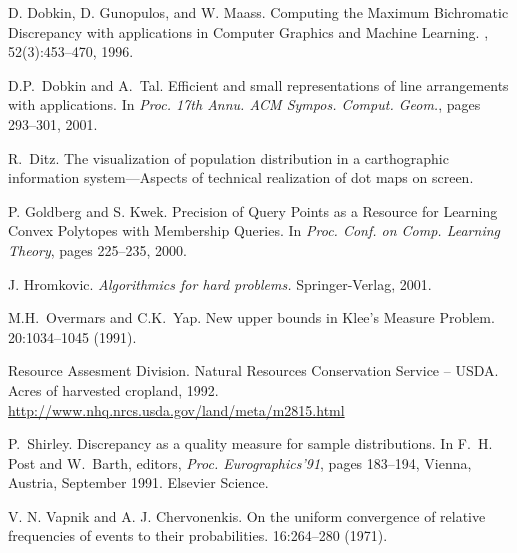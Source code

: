 \documentclass{elsart}
\newcommand{\patscomment}[1]{}
\begin{document}
\begin{thebibliography}{99}
D. Dobkin, D. Gunopulos, and W. Maass.
\newblock Computing the Maximum Bichromatic Discrepancy with applications in Computer Graphics and Machine Learning.
, 52(3):453--470, 1996.


  D.P.~Dobkin and A.~Tal.
  \newblock Efficient and small representations of line arrangements
  with applications.
  \newblock In {\em Proc. 17th Annu. ACM Sympos. Comput. Geom.},
  pages 293--301, 2001.

  R.~Ditz. The visualization of population distribution in a carthographic
  information system---Aspects of technical realization of dot maps on screen.

P. Goldberg and S. Kwek.
\newblock Precision of Query Points as a Resource for Learning Convex Polytopes
with Membership Queries.
\newblock In {\em Proc. Conf. on Comp. Learning Theory}, pages 225--235, 2000.

J. Hromkovic. 
\newblock \emph{Algorithmics for hard problems.}
\newblock Springer-Verlag, 2001.


  M.H.~Overmars and C.K.~Yap.
  \newblock New upper bounds in Klee's Measure Problem.
   20:1034--1045 (1991).

  Resource Assesment Division.
  Natural Resources Conservation Service -- USDA.
  Acres of harvested cropland, 1992.
  \url{http://www.nhq.nrcs.usda.gov/land/meta/m2815.html}

P.~Shirley.
\newblock Discrepancy as a quality measure for sample distributions.
\newblock In F.~H. Post and W.~Barth, editors, {\em Proc. Eurographics'91},
  pages 183--194, Vienna, Austria, September 1991. Elsevier Science.


 V. N. Vapnik and A. J. Chervonenkis.
  \newblock On the uniform convergence of relative frequencies of events
  to their probabilities.
  16:264--280 (1971).


\end{thebibliography}

\patscomment{
Table~\ref{table2} shows our results.  All errors
were computed using squares of 60 fixed sizes.  Each column was
computed for only one set $P$. \comment{Perhaps we should repeat the
  generate at least a few sets for each distribution ?}
%
\begin{table}
  
  \caption{Various heuristics.
    \label{table2}}
\end{table}
\medskip
}

\end{document}

